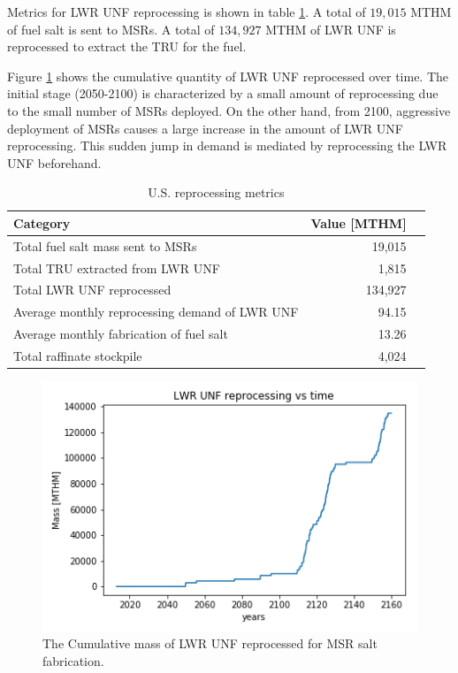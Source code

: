 Metrics for \gls{LWR} \gls{UNF} reprocessing
is shown in table \ref{tab:us_rep}. A total of
$19,015$ MTHM of fuel salt is sent to \glspl{MSR}.
A total of $134,927$ MTHM of \gls{LWR} \gls{UNF}
is reprocessed to extract the \gls{TRU} for the fuel.

Figure \ref{fig:lwr_unf_reproc} shows the cumulative quantity of \gls{LWR}
\gls{UNF} reprocessed over time. The initial stage (2050-2100) is characterized
by a small amount of reprocessing due to the small number of \glspl{MSR} deployed.
On the other hand, from 2100, aggressive deployment of \glspl{MSR} causes
a large increase in the amount of \gls{LWR} \gls{UNF} reprocessing. This sudden
jump in demand is mediated by reprocessing the \gls{LWR} \gls{UNF} beforehand.

\begin{table}[h]
	\centering
	\caption{U.S. reprocessing metrics}
	\begin{tabular}{lrl}
		\hline
		\textbf{Category} & \textbf{Value [MTHM]} \\
		\hline
		Total fuel salt mass sent to \gls{MSR}s & 19,015 \\
		Total TRU extracted from \gls{LWR} \gls{UNF} & 1,815 \\
		Total \gls{LWR} \gls{UNF} reprocessed & 134,927 \\
		Average monthly reprocessing demand of \gls{LWR} \gls{UNF} & 94.15 \\
		Average monthly fabrication of fuel salt & 13.26 \\
		Total raffinate stockpile & 4,024 \\
		\hline
	\end{tabular}
	\label{tab:us_rep}
\end{table}


\begin{figure}[htbp!]
	\begin{center}
		\includegraphics[scale=0.7]{./images/us/lwr_unf_reproc.png}
	\end{center}
	\caption{The Cumulative mass of \gls{LWR} \gls{UNF} reprocessed for \gls{MSR} salt fabrication.}
	\label{fig:lwr_unf_reproc}
\end{figure}

